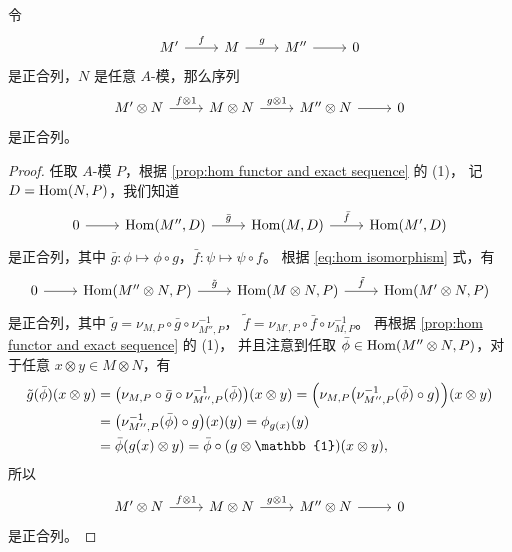 \begin{proposition}\label{prop:tensor functor and exact sequence}
  令
  \[
    \begin{tikzcd}
      M'\arrow[r,"f"] & M\arrow[r,"g"] & M''\arrow[r] & 0
    \end{tikzcd}  
  \]
  是正合列，$N$ 是任意 $A$-模，那么序列
  \[
    \begin{tikzcd}
      M'\otimes N\arrow[r,"f\otimes 1"] & M\otimes N\arrow[r,"g\otimes 1"] & M''\otimes N\arrow[r] & 0
    \end{tikzcd}  
  \]
  是正合列。
\end{proposition}
\begin{proof}
  任取 $A$-模 $P$，根据 \autoref{prop:hom functor and exact sequence} 的 (1)，
  记 $D=\operatorname{Hom}(N,P)$，我们知道
  \[
    \begin{tikzcd}
      0\arrow[r] &
      \Hom(M'',D)\arrow[r,"\bar g"] & 
      \Hom(M,D)\arrow[r,"\bar f"] &
      \Hom(M',D)
    \end{tikzcd}  
  \]
  是正合列，其中 $\bar g:\phi\mapsto \phi\circ g$，$\bar f:\psi\mapsto \psi\circ f$。
  根据 \eqref{eq:hom isomorphism} 式，有
  \[
    \begin{tikzcd}
      0\arrow[r] &
      \Hom(M''\otimes N,P)\arrow[r,"\tilde g"] & 
      \Hom(M\otimes N,P)\arrow[r,"\tilde f"] &
      \Hom(M'\otimes N,P)
    \end{tikzcd}  
  \]
  是正合列，其中 $\tilde{g}=\nu_{M,P}\circ \bar g\circ \nu_{M'',P}^{-1}$，
  $\tilde{f}=\nu_{M',P}\circ \bar f\circ\nu_{M,P}^{-1}$。
  再根据 \autoref{prop:hom functor and exact sequence} 的 (1)，
  并且注意到任取 $\bar\phi\in\operatorname{Hom}(M''\otimes N,P)$，对于任意 $x\otimes y\in M\otimes N$，有
  \begin{align*}
    \tilde{g}(\bar\phi)(x\otimes y)&=
    \bigl(\nu_{M,P}\circ \bar g\circ \nu_{M'',P}^{-1}(\bar\phi)\bigr)(x\otimes y)
    =\Bigl(\nu_{M,P}\bigl(\nu_{M'',P}^{-1}(\bar\phi)\circ g\bigr)\Bigr)(x\otimes y)\\
    &=\bigl(\nu_{M'',P}^{-1}(\bar\phi)\circ g\bigr)(x)(y)
    =\phi_{g(x)}(y)\\
    &=\bar\phi(g(x)\otimes y)=\bar\phi\circ (g\otimes \mathbb{1})(x\otimes y),
  \end{align*}
  所以
  \[
    \begin{tikzcd}
      M'\otimes N\arrow[r,"f\otimes 1"] & M\otimes N\arrow[r,"g\otimes 1"] & M''\otimes N\arrow[r] & 0
    \end{tikzcd}  
  \]
  是正合列。
\end{proof}

